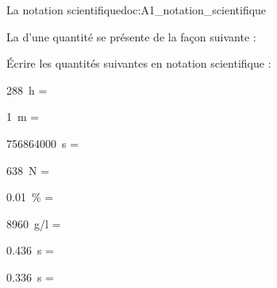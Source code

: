 \vspace*{-12pt}
\begin{doc}{La notation scientifique}{doc:A1_notation_scientifique}
  \begin{importants}
  La  d'une quantité se présente de la façon suivante :
  \begin{center}
    \qq{}
    \qq{}
  \end{center}
  \vspace*{-30pt} \hspace*{4pt}
  \end{importants}
\end{doc}

\numeroQuestion Écrire les quantités suivantes en notation scientifique :
\vspace*{-4pt}
\begin{multicols}{2}
  \begin{listePoints}
    \item \qty{288}{\hour}      = 
    \item \qty{1}{\m}           = 
    \item \qty{756 864 000}{\s} = 
    \item \qty{638}{\newton}    = 
    \item \qty{0,01}{\percent} = 
    \item \qty{8960}{\g/\l}    = 
    \item \qty{0,436}{\s}      = 
    \item \qty{0,336}{\s}      = 
  \end{listePoints}
\end{multicols}
\vspace*{-4pt}

